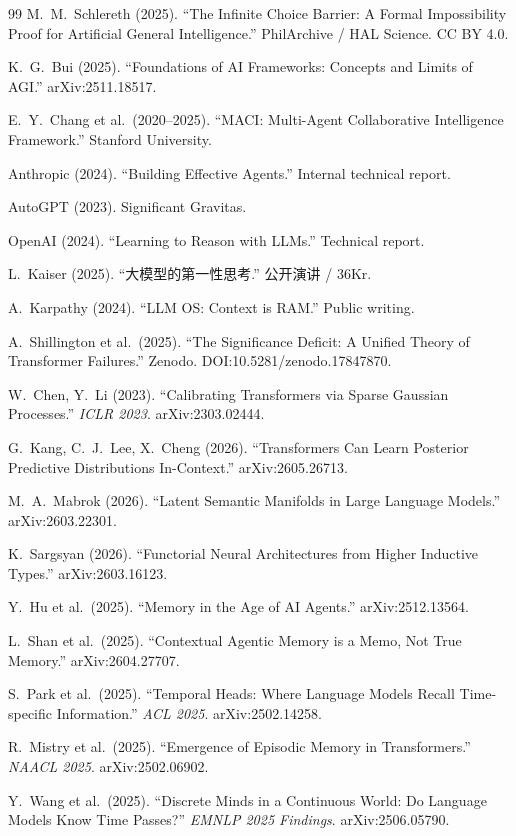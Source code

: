 \documentclass[11pt,a4paper]{ctexart}
\begin{document}
\begin{thebibliography}{99}
M.~M.~Schlereth (2025).
``The Infinite Choice Barrier: A Formal Impossibility Proof for Artificial General Intelligence.''
PhilArchive / HAL Science. CC BY 4.0.

K.~G.~Bui (2025).
``Foundations of AI Frameworks: Concepts and Limits of AGI.''
arXiv:2511.18517.

E.~Y.~Chang et al.\ (2020--2025).
``MACI: Multi-Agent Collaborative Intelligence Framework.''
Stanford University.

Anthropic (2024).
``Building Effective Agents.''
Internal technical report.

AutoGPT (2023). Significant Gravitas.

OpenAI (2024).
``Learning to Reason with LLMs.''
Technical report.

L.~Kaiser (2025).
``大模型的第一性思考.''
公开演讲 / 36Kr.

A.~Karpathy (2024).
``LLM OS: Context is RAM.''
Public writing.

A.~Shillington et al.\ (2025).
``The Significance Deficit: A Unified Theory of Transformer Failures.''
Zenodo. DOI:10.5281/zenodo.17847870.

W.~Chen, Y.~Li (2023).
``Calibrating Transformers via Sparse Gaussian Processes.''
\textit{ICLR 2023}. arXiv:2303.02444.

G.~Kang, C.~J.~Lee, X.~Cheng (2026).
``Transformers Can Learn Posterior Predictive Distributions In-Context.''
arXiv:2605.26713.

M.~A.~Mabrok (2026).
``Latent Semantic Manifolds in Large Language Models.''
arXiv:2603.22301.

K.~Sargsyan (2026).
``Functorial Neural Architectures from Higher Inductive Types.''
arXiv:2603.16123.

Y.~Hu et al.\ (2025).
``Memory in the Age of AI Agents.''
arXiv:2512.13564.

L.~Shan et al.\ (2025).
``Contextual Agentic Memory is a Memo, Not True Memory.''
arXiv:2604.27707.

S.~Park et al.\ (2025).
``Temporal Heads: Where Language Models Recall Time-specific Information.''
\textit{ACL 2025}. arXiv:2502.14258.

R.~Mistry et al.\ (2025).
``Emergence of Episodic Memory in Transformers.''
\textit{NAACL 2025}. arXiv:2502.06902.

Y.~Wang et al.\ (2025).
``Discrete Minds in a Continuous World: Do Language Models Know Time Passes?''
\textit{EMNLP 2025 Findings}. arXiv:2506.05790.

\end{thebibliography}
\end{document}
